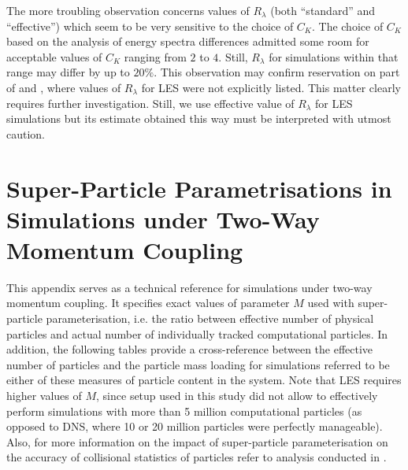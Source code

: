 \documentclass{pracamgren}
\begin{document}
The more troubling observation concerns values of $R_{\lambda}$ (both ``standard'' and ``effective'') which seem to be very sensitive to the choice of $C_K$.
The choice of $C_K$ based on the analysis of energy spectra differences admitted some room for acceptable values of $C_K$ ranging from $2$ to $4$.
Still, $R_{\lambda}$ for simulations within that range may differ by up to $20\%$.
This observation may confirm reservation on part of \textcite{Yang2008} and \textcite{Jin2010}, where values of $R_{\lambda}$ for LES were not explicitly listed.
This matter clearly requires further investigation.
Still, we use effective value of $R_{\lambda}$ for LES simulations but its estimate obtained this way must be interpreted with utmost caution.  



\chapter{Super-Particle Parametrisations in Simulations under Two-Way Momentum Coupling}
\label{app:spp}

This appendix serves as a technical reference for simulations under two-way momentum coupling.
It specifies exact values of parameter $M$ used with super-particle parameterisation, i.e. the ratio between effective number of physical particles and actual number of individually tracked computational particles.
In addition, the following tables provide a cross-reference between the effective number of particles and the particle mass loading for simulations referred to be either of these measures of particle content in the system.
Note that LES requires higher values of $M$, since setup used in this study did not allow to effectively perform simulations with more than 5 million computational particles (as opposed to DNS, where 10 or 20 million particles were perfectly manageable).
Also, for more information on the impact of super-particle parameterisation on the accuracy of collisional statistics of particles refer to analysis conducted in \textcite{Rosa2022}.  
\end{document}
